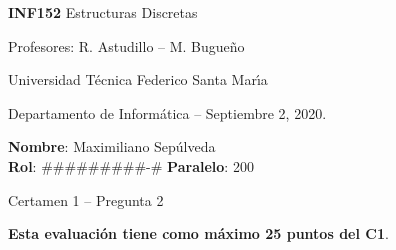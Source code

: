 \documentclass[legalpaper,10pt]{article}
\begin{document}
\thispagestyle{empty}

\begin{minipage}[t]{0.6\textwidth}

{\LARGE \textbf{INF152} Estructuras Discretas}

{\large Profesores: R. Astudillo -- M. Bugueño}

Universidad Técnica Federico Santa Mar\'{\i}a

Departamento de Informática -- Septiembre 2, 2020.

\end{minipage}
\hfill
\begin{minipage}[t]{0.35\textwidth}
\textbf{Nombre}: Maximiliano Sepúlveda\\[0.3cm]
\textbf{Rol}: #########-# \textbf{Paralelo}: 200
\end{minipage}

\vspace{0.8cm}

{\Large Certamen 1 -- Pregunta 2}

\vspace{0.4cm}

\textbf{Esta evaluación tiene como máximo 25 puntos del C1}.
\end{document}
